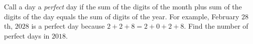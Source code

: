 Call a day a \emph{perfect} day if the sum of the digits of the month plus sum of the digits of the day equals the sum of digits of the year. For example, February $28$th, $2028$ is a perfect day because $2+2+8=2+0+2+8$. Find the number of perfect days in $2018$.